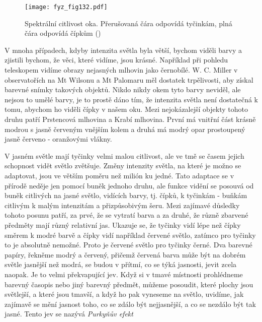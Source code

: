 {    \begin{figure}[ht!]  %
      \centering
      \texttt{[image: fyz\_fig132.pdf]}
      \caption{Spektrální citlivost oka. Přerušovaná čára odpovídá tyčinkám, plná čára odpovídá 
               čípkům
               (\cite[s.~470]{Feynman01})}
      \label{fyz:fig132}
    \end{figure}
    V mnoha případech, kdyby intenzita světla byla větší, bychom viděli barvy a zjistili bychom, že 
    věci, které vidíme, jsou krásné. Například při pohledu teleskopem vidíme obrazy nejasných 
    mlhovin jako černobílé. W. C. Miller v observatořích na Mt Wilsonu a Mt Palomaru měl dostatek 
    trpělivosti, aby získal barevné snímky takových objektů. Nikdo nikdy okem tyto barvy neviděl, 
    ale nejsou to umělé barvy, je to prostě dáno tím, že intenzita světla není dostatečná k tomu, 
    abychom ho viděli čípky v našem oku. Mezi nejokázalejší objekty tohoto druhu patří Prstencová 
    mlhovina a Krabí mlhovina. První má vnitřní část krásně modrou s jasně červeným vnějším kolem a 
    druhá má modrý opar prostoupený jasně červeno - oranžovými vlákny.
    
    V jasném světle mají tyčinky velmi malou citlivost, ale ve tmě se časem jejich schopnost vidět 
    světlo zvětšuje. Změny intenzity světla, na které je možno se adaptovat, jsou ve větším poměru 
    než milión ku jedné. Tato adaptace se v přírodě neděje jen pomocí buněk jednoho druhu, ale 
    funkce vidění se posouvá od buněk citlivých na jasné světlo, vidících barvy, tj. čípků, k 
    tyčinkám - buňkám citlivým k malým intenzitám a přizpůsobivým šeru. Mezi zajímavé důsledky 
    tohoto posunu patří, za prvé, že se vytratí barva a za druhé, že různě zbarvené předměty mají 
    různý relativní jas. Ukazuje se, že tyčinky vidí lépe než čípky směrem k modré barvě a čípky 
    vidí například červené světlo, zatímco pro tyčinky to je absolutně nemožné. Proto je červené 
    světlo pro tyčinky černé. Dva barevné papíry, řekněme modrý a červený, přičemž červená barva 
    může být na dobrém světle jasnější než modrá, se budou v přítmí, co se týká jasnosti, jevit 
    zcela naopak. Je to velmi překvapující jev. Když si v tmavé místnosti prohlédneme barevný 
    časopis nebo jiný barevný předmět, můžeme posoudit, které plochy jsou světlejší, a které jsou 
    tmavší, a když ho pak vyneseme na světlo, uvidíme, jak zajímavě se mění jasnost toho, co se 
    zdálo být nejjasnější, a co se nezdálo být tak jasné. Tento jev se nazývá \emph{Purkyňův efekt}
    
}
